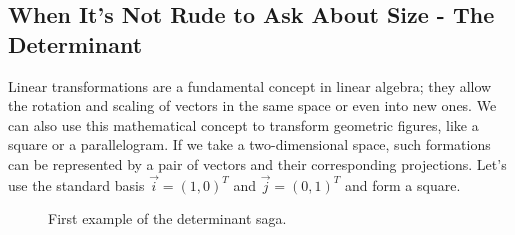 \documentclass[a4,12pt,twosided,openany]{memoir}
\begin{document}
\subsection{When It’s Not Rude to Ask About Size - The Determinant}
\par 
\indent
Linear transformations are a fundamental concept in linear algebra; they allow the rotation and scaling of vectors in the same space or even into new ones. We can also use this mathematical concept to transform geometric figures, like a square or a parallelogram. If we take a two-dimensional space, such formations can be represented by a pair of vectors and their corresponding projections. Let’s use the standard basis $\overrightarrow{i} =(1,0)^T $ and $\overrightarrow{j} = (0,1) ^T$ and form a square.
\begin{figure}[h!]
\begin{center}
\end{center}
\caption{First example of the determinant saga.}
\end{figure}
\par 
\end{document}
